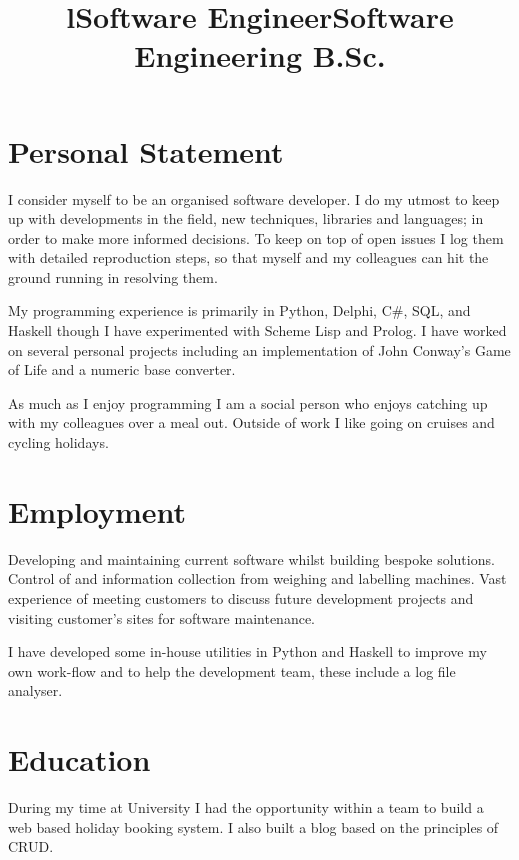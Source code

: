 \documentclass[line,margin]{res}
\title{l} \location{r} \\
\newcommand{\hash}{\#}
\newcommand{\CSharp}{C\hash}
\begin{document}
\begin{resume}

\section{Personal Statement}
I consider myself to be an organised software developer.
I do my utmost to keep up with developments in the field, new techniques, libraries and languages; in order to make more informed decisions.
To keep on top of open issues I log them with detailed reproduction steps, so that myself and my colleagues can hit the ground running in resolving them.

My programming experience is primarily in Python, Delphi, {\CSharp}, SQL, and Haskell though I have experimented with Scheme Lisp and Prolog.
I have worked on several personal projects including an implementation of John Conway's Game of Life and a numeric base converter.

As much as I enjoy programming I am a social person who enjoys catching up with my colleagues over a meal out.
Outside of work I like going on cruises and cycling holidays.

\section{Employment}

\title{Software Engineer}
\begin{position}
Developing and maintaining current software whilst building bespoke solutions.
Control of and information collection from weighing and labelling machines.
Vast experience of meeting customers to discuss future development projects and visiting customer's sites for software maintenance.

I have developed some in-house utilities in Python and Haskell to improve my own work-flow and to help the development team, these include a log file analyser.
\end{position}

\section{Education}

\title{Software Engineering B.Sc.} %
\begin{position}
During my time at University I had the opportunity within a team to build a web based holiday booking system.
I also built a blog based on the principles of CRUD.


\end{position}
\end{resume}
\end{document}
